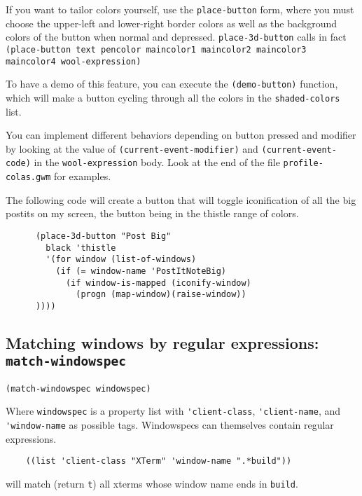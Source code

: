 If you want to tailor colors yourself, use the \verb|place-button| form, where
you must choose the upper-left and lower-right border colors as well as the
background colors of the button when normal and depressed.
\verb|place-3d-button| calls in fact {\tt (place-button text pencolor
maincolor1 maincolor2 maincolor3 maincolor4 wool-expression)}

To have a demo of this feature, you can execute the \verb|(demo-button)|
function, which will make a button cycling through all the colors in the
\verb|shaded-colors| list.

You can implement different behaviors depending on button pressed and modifier
by looking at the value of \verb|(current-event-modifier)| and
\verb|(current-event-code)| in the \verb|wool-expression| body. Look at the
end of the file \verb|profile-colas.gwm| for examples.

The following code will create a button that will toggle iconification of all
the big postits on my screen, the button being in the thistle range of colors.

{\exemplefont\begin{verbatim}
      (place-3d-button "Post Big"
        black 'thistle
        '(for window (list-of-windows) 
          (if (= window-name 'PostItNoteBig)
            (if window-is-mapped (iconify-window)
              (progn (map-window)(raise-window))
      ))))
\end{verbatim}}
 
\centerline{}

\subsection{Matching windows by regular expressions: {\tt match-windowspec}}
\label{match-windowspec}

{\usagefont\begin{verbatim}
(match-windowspec windowspec)
\end{verbatim}}\usageupspace

Where \verb|windowspec| is a property list with \verb|'client-class|,
\verb|'client-name|,  and \verb|'window-name| as possible tags. Windowspecs 
can themselves contain regular expressions.

{\exemplefont\begin{verbatim}
	((list 'client-class "XTerm" 'window-name ".*build"))
\end{verbatim}}
will match (return \verb|t|) all xterms whose window name ends in \verb|build|.

